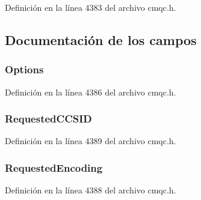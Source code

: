 Definición en la línea 4383 del archivo cmqc.\+h.



\subsection{Documentación de los campos}
\hypertarget{structtag_m_q_i_m_p_o_ad7aff2d6c6044809464380998d24ec5c}{}
\subsubsection[{Options}]{ Options}\label{structtag_m_q_i_m_p_o_ad7aff2d6c6044809464380998d24ec5c}


Definición en la línea 4386 del archivo cmqc.\+h.

\hypertarget{structtag_m_q_i_m_p_o_aeae366c610d7d1de844e33938f66209e}{}
\subsubsection[{Requested\+C\+C\+S\+I\+D}]{ Requested\+C\+C\+S\+I\+D}\label{structtag_m_q_i_m_p_o_aeae366c610d7d1de844e33938f66209e}


Definición en la línea 4389 del archivo cmqc.\+h.

\hypertarget{structtag_m_q_i_m_p_o_a3e0b97e59d454d52f8192b1f3924ffb2}{}
\subsubsection[{Requested\+Encoding}]{ Requested\+Encoding}\label{structtag_m_q_i_m_p_o_a3e0b97e59d454d52f8192b1f3924ffb2}


Definición en la línea 4388 del archivo cmqc.\+h.

\hypertarget{structtag_m_q_i_m_p_o_a4559672a5bdaff57eb82aa03d163ed47}{}
